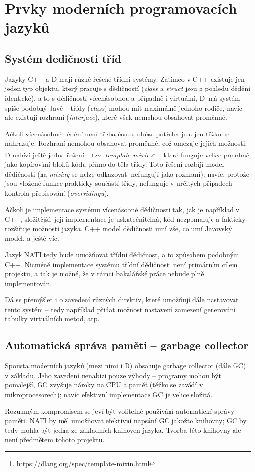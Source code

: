 \section{Prvky moderních programovacích jazyků}

\subsection{Systém dedičnosti tříd} Jazyky C++ a D mají různě řešené třídní systémy. Zatímco v C++ existuje jen jeden typ objektu, který pracuje s dědičností (\textit{class} a \textit{struct} jsou z pohledu dědění identické), a to s dědičností vícenásobnou a případně i virtuální, D~má systém spíše podobný Javě -- třídy (\textit{class}) mohou mít maximálně jednoho rodiče, navíc ale existují rozhraní (\textit{interface}), které však nemohou obsahovat proměnné.

Ačkoli vícenásobné dědění není třeba často, občas potřeba je a jen těžko se nahrazuje. Rozhraní nemohou obsahovat proměnné, což omezuje jejich možnosti. D nabízí ještě jedno řešení -- tzv. \textit{template mixins}\footnote{https://dlang.org/spec/template-mixin.html} -- které funguje velice podobně jako kopírování bloků kódu přímo do těla třídy. Toto řešení rozbíjí model dědičnosti (na \textit{mixiny} se nelze odkazovat, nefungují jako rozhraní); navíc, protože jsou vložené funkce prakticky součástí třídy, nefunguje v určitých případech kontrola přepisování (\textit{overridingu}).

Ačkoli je implementace systému vícenásobné dědičnosti tak, jak je například v C++, složitější, její implementace je uskutečnitelná, kód nezpomaluje a fakticky rozšiřuje možnosti jazyka. C++ model dědičnosti umí vše, co umí Javovský model, a ještě víc.

Jazyk NATI tedy bude umožňovat třídní dědičnost, a to způsobem podobným C++. Nicméně implementace systému třídní dědičnosti není primárním cílem projektu, a tak je možné, že v rámci bakalářské práce nebude plně implementován.

Dá se přemýšlet i o zavedení různých direktiv, které umožňují dále nastavovat tento systém -- tedy například přidat možnost nastavení zamezení generování tabulky virtuálních metod, atp.

\subsection{Automatická správa paměti -- garbage collector}
Spousta moderních jazyků (mezi nimi i D) obsahuje garbage collector (dále GC) v základu. Jeho zavedení nenabízí pouze výhody -- programy mohou být pomalejší, GC zvyšuje nároky na CPU a paměť (těžko se zavádí v mikroprocesorech); navíc efektivní implementace GC je velice složitá.

Rozumným kompromisem se jeví být volitelné používání automatické správy paměti. NATI by měl umožňovat efektivní napsání GC jakožto knihovny; GC by tedy mohla být jedna ze základních knihoven jazyka. Tvorba této knihovny ale není předmětem tohoto projektu.

          
